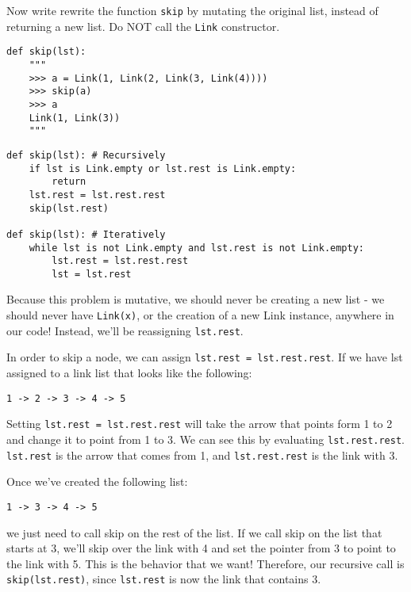 \begin{blocksection}
\question Now write rewrite the function \texttt{skip} by mutating the original list, instead of returning a new list. Do NOT call the \texttt{Link} constructor.

\begin{lstlisting}
def skip(lst):
    """
    >>> a = Link(1, Link(2, Link(3, Link(4))))
    >>> skip(a)
    >>> a
    Link(1, Link(3))
    """
\end{lstlisting}

\begin{solution}[0in]
\begin{lstlisting}
def skip(lst): # Recursively
    if lst is Link.empty or lst.rest is Link.empty:
        return
    lst.rest = lst.rest.rest
    skip(lst.rest)

def skip(lst): # Iteratively
    while lst is not Link.empty and lst.rest is not Link.empty:
        lst.rest = lst.rest.rest
        lst = lst.rest
\end{lstlisting}
Because this problem is mutative, we should never be creating a new list - we should never have \lstinline{Link(x)}, or the creation of a new Link instance, anywhere in our code! Instead, we’ll be reassigning \lstinline{lst.rest}.

In order to skip a node, we can assign \lstinline{lst.rest = lst.rest.rest}. If we have lst assigned to a link list that looks like the following:
\begin{lstlisting}
1 -> 2 -> 3 -> 4 -> 5
\end{lstlisting}
Setting \lstinline{lst.rest = lst.rest.rest} will take the arrow that points form 1 to 2 and change it to point from 1 to 3. We can see this by evaluating \lstinline{lst.rest.rest}. \lstinline{lst.rest} is the arrow that comes from 1, and \lstinline{lst.rest.rest} is the link with 3.

Once we’ve created the following list:
\begin{lstlisting}
1 -> 3 -> 4 -> 5
\end{lstlisting}
we just need to call skip on the rest of the list. If we call skip on the list that starts at 3, we’ll skip over the link with 4 and set the pointer from 3 to point to the link with 5. This is the behavior that we want! Therefore, our recursive call is \lstinline{skip(lst.rest)}, since \lstinline{lst.rest} is now the link that contains 3.

\end{solution}
\end{blocksection}

